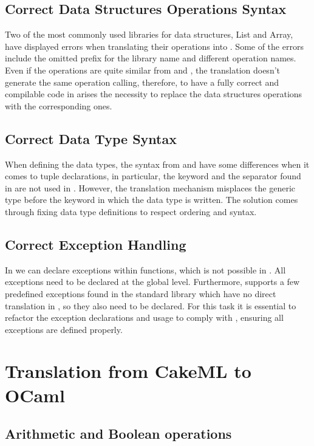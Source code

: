 \subsection{Correct Data Structures Operations Syntax}

Two of the most commonly used libraries for data structures, List and Array, have displayed errors when translating their operations into 
\cml. Some of the errors include the omitted prefix for the library name and different operation names. 
Even if the operations are quite similar from \ocaml and \cml, the translation doesn't generate the same operation calling, therefore, to 
have a fully correct and compilable code in \cml arises the necessity to replace the data structures operations with the corresponding 
ones.

\subsection{Correct Data Type Syntax}

When defining the data types, the syntax from \ocaml and \cml have some differences when it comes to tuple declarations, in particular, 
the  keyword and the separator \inlinecode{*} found in \ocaml are not used in \cml. However, the translation mechanism 
misplaces the generic type before the  keyword in which the data type is written. The solution comes through fixing 
data type definitions to respect \cml ordering and syntax.

\subsection{Correct Exception Handling}

In \ocaml we can declare exceptions within functions, which is not possible in \cml. All exceptions need to be declared at the global 
level. Furthermore, \ocaml supports a few predefined exceptions found in the standard library which have no direct translation in
\cml, so they also need to be declared. For this task it is essential to refactor the exception declarations and usage to comply with 
\cml, ensuring all exceptions are defined properly.

\section{Translation from CakeML to OCaml}

\subsection{Arithmetic and Boolean operations}

